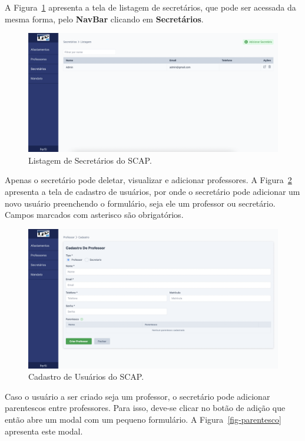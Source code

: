 A Figura~\ref{fig-listagem-secretarios} apresenta a tela de listagem de secretários, que pode ser acessada
da mesma forma, pelo \textbf{NavBar} clicando em \textbf{Secretários}.

\begin{figure}[h!]
    \centering
    \includegraphics[width=\textwidth]{figuras/prints-app/fig-lista-secretario.png}
    \caption{Listagem de Secretários do SCAP.}
    \label{fig-listagem-secretarios}
\end{figure}

Apenas o secretário pode deletar, visualizar e adicionar professores. A Figura~\ref{fig-cadastro-professor} apresenta
a tela de cadastro de usuários, por onde o secretário pode adicionar um novo usuário preenchendo o formulário,
seja ele um professor ou secretário. Campos marcados com asterisco são obrigatórios.

\begin{figure}[h!]
    \centering
    \includegraphics[width=\textwidth]{figuras/prints-app/fig-cadastro-professor.png}
    \caption{Cadastro de Usuários do SCAP.}
    \label{fig-cadastro-professor}
\end{figure}


Caso o usuário a ser criado seja um professor, o secretário pode adicionar parentescos entre professores.
Para isso, deve-se clicar no botão de adição que então abre um modal com um pequeno formulário.
A Figura~\ref{fig-parentesco} apresenta este modal.


